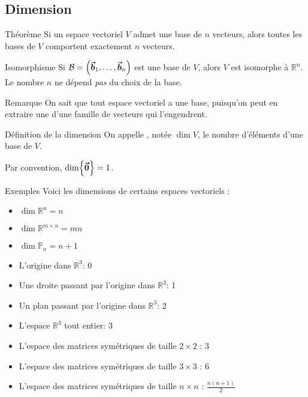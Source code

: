 \documentclass[a4paper]{article}
\begin{document}
\subsection{Dimension}
\begin{parag}{Théorème}
    Si un espace vectoriel $V$ admet une base de $n$ vecteurs, alors toutes les bases de $V$ comportent exactement $n$ vecteurs.

    \begin{subparag}{Isomorphisme}
        Si $\mathcal{B} = \left(\bvec{b}_1, \ldots, \bvec{b}_n\right)$ est une base de $V$, alors $V$ est isomorphe à $\mathbb{R}^{n}$. Le nombre $n$ ne dépend \textit{pas} du choix de la base.
    \end{subparag}

    \begin{subparag}{Remarque}
        On sait que tout espace vectoriel a une base, puisqu'on peut en extraire une d'une famille de vecteurs qui l'engendrent.
    \end{subparag}
\end{parag}

\begin{parag}{Définition de la dimension}
    On appelle , notée $\dim V$, le nombre d'éléments d'une base de $V$.

    Par convention, $\dim \left\{\bvec{0}\right\} = 1$.
\end{parag}

\begin{parag}{Exemples}
    Voici les dimensions de certains espaces vectoriels :
    \begin{itemize}
        \item $\dim\mathbb{R}^{n} = n$
        \item $\dim \mathbb{R}^{m \times n} = mn$
        \item $\dim \mathbb{P}_n = n + 1$
        \item L'origine dans $\mathbb{R}^{3}$: 0
        \item Une droite passant par l'origine dans $\mathbb{R}^{3}$: 1
        \item Un plan passant par l'origine dans $\mathbb{R}^{3}$: 2
        \item L'espace $\mathbb{R}^{3}$ tout entier: 3
        \item L'espace des matrices symétriques de taille $2\times2$ : 3
        \item L'espace des matrices symétriques de taille $3\times3$ : 6
        \item L'espace des matrices symétriques de taille $n\times n$ : $\frac{n\left(n+1\right)}{2}$
    \end{itemize}
\end{parag}
\end{document}
